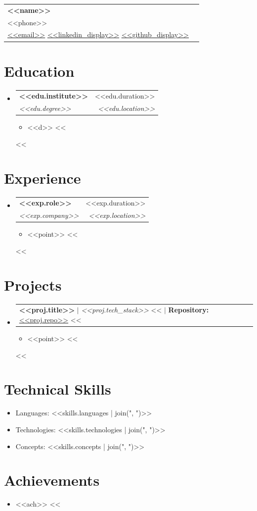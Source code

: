 \documentclass[letterpaper,10pt]{article}
\newcommand{\resumeSubHeadingListStart}{\begin{itemize}[leftmargin=*, nosep]}
\newcommand{\resumeSubHeadingListEnd}{\end{itemize}}
\newcommand{\resumeItemListStart}{\begin{itemize}[leftmargin=*, nosep]}
\newcommand{\resumeItemListEnd}{\end{itemize}}
\newcommand{\resumeSubheading}[4]{
  \item
    \vspace{-2pt}
    \begin{tabularx}{\textwidth}{X r}
      \textbf{#1} & #2 \\
      \textit{#3} & \textit{#4} \\
    \end{tabularx}
    \vspace{-4pt}
}
\newcommand{\resumeProjectHeading}[2]{
  \item
    \vspace{-2pt}
    \begin{tabularx}{\textwidth}{X r}
      #1 & #2 \\
    \end{tabularx}
    \vspace{-4pt}
}
\newcommand{\resumeItem}[1]{\item #1}
\begin{document}
\begin{tabularx}{\textwidth}{@{} X r @{}}
\textbf{\Huge <<name>>} \\
\small <<phone>> \\
\href{mailto:<<email>>}{<<email>>} \quad
\href{<<linkedin>>}{<<linkedin_display>>} \quad
\href{<<github>>}{<<github_display>>}
\end{tabularx}

\vspace{-6pt}

\section{Education}
\resumeSubHeadingListStart
<<%
\resumeSubheading
{<<edu.institute>>}{<<edu.duration>>}
{<<edu.degree>>}{<<edu.location>>}
\resumeItemListStart
<<%
\resumeItem{<<d>>}
<<%
\resumeItemListEnd
<<%
\resumeSubHeadingListEnd

\section{Experience}
\resumeSubHeadingListStart
<<%
\resumeSubheading
{<<exp.role>>}{<<exp.duration>>}
{<<exp.company>>}{<<exp.location>>}
\resumeItemListStart
<<%
\resumeItem{<<point>>}
<<%
\resumeItemListEnd
<<%
\resumeSubHeadingListEnd

\section{Projects}
\resumeSubHeadingListStart
<<%
\resumeProjectHeading
{\textbf{<<proj.title>>} $|$ \emph{<<proj.tech_stack>>}
<<%
$|$ \textbf{Repository:}\href{<<proj.repo_link>>}{<<proj.repo>>}
<<%
}{}
\resumeItemListStart
<<%
\resumeItem{<<point>>}
<<%
\resumeItemListEnd
<<%
\resumeSubHeadingListEnd

\section{Technical Skills}
\begin{itemize}[nosep]
\item Languages: <<skills.languages | join(", ")>>
\item Technologies: <<skills.technologies | join(", ")>>
\item Concepts: <<skills.concepts | join(", ")>>
\end{itemize}

\section{Achievements}
\begin{itemize}[nosep]
<<%
\item <<ach>>
<<%
\end{itemize}
\end{document}

